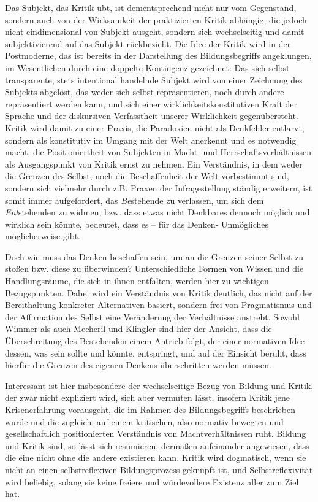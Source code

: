 Das Subjekt, das Kritik übt, ist dementsprechend nicht nur vom Gegenstand,
sondern auch von der Wirksamkeit der praktizierten Kritik abhängig, die jedoch
nicht eindimensional von Subjekt ausgeht, sondern sich wechselseitig und damit
subjektivierend auf das Subjekt rückbezieht. Die Idee der Kritik wird in der
Postmoderne, das ist bereits in der Darstellung des Bildungsbegriffs
angeklungen, im Wesentlichen durch eine doppelte Kontingenz gezeichnet: Das
sich selbst transparente, stets intentional handelnde Subjekt wird von einer
Zeichnung des Subjekts abgelöst, das weder sich selbst repräsentieren, noch
durch andere repräsentiert werden kann, und sich einer
\glqq wirklichkeitskonstitutiven Kraft der Sprache und der diskursiven Verfasstheit
unserer Wirklichkeit \grqq\footnotemark {} gegenübersteht. Kritik wird damit zu einer Praxis, die
Paradoxien nicht als Denkfehler entlarvt, sondern als konstitutiv im Umgang mit
der Welt  anerkennt und es notwendig macht, die Positioniertheit von Subjekten
in Macht- und Herrschaftsverhältnissen als Ausgangspunkt von Kritik ernst zu
nehmen.  Ein Verständnis, in dem weder die Grenzen des Selbst, noch die
Beschaffenheit der Welt vorbestimmt sind, sondern sich vielmehr durch z.B.
Praxen der Infragestellung ständig erweitern, ist somit immer aufgefordert, das
\textit{Be}stehende zu verlassen, um sich dem \textit{Ent}stehenden zu widmen, bzw. \glqq dass etwas
nicht Denkbares dennoch möglich und wirklich sein könnte, bedeutet, dass es –
für das Denken- Unmögliches möglicherweise gibt.\grqq\footnotemark
{}

Doch wie muss das Denken beschaffen sein, um an die Grenzen seiner Selbst zu
stoßen bzw. diese zu überwinden? Unterschiedliche Formen von Wissen und die
Handlungsräume, die sich in ihnen entfalten, werden hier zu wichtigen
Bezugspunkten.  Dabei wird ein Verständnis von Kritik deutlich, das nicht auf
der Bereithaltung konkreter Alternativen basiert, sondern frei von Pragmatismus
und der Affirmation des Selbst eine Veränderung der Verhältnisse anstrebt.
Sowohl Wimmer als auch Mecheril und Klingler sind hier der Ansicht, dass die
Überschreitung des Bestehenden einem Antrieb folgt, der einer normativen Idee
dessen, was sein sollte und könnte, entspringt, und auf der Einsicht beruht,
dass hierfür die Grenzen des eigenen Denkens überschritten werden müssen.

Interessant ist hier insbesondere der wechselseitige Bezug von Bildung und
Kritik, der zwar nicht expliziert wird, sich aber vermuten lässt, insofern
Kritik jene Krisenerfahrung vorausgeht, die im Rahmen des Bildungsbegriffs
beschrieben wurde und die zugleich, auf einem kritischen, also normativ
bewegten und gesellschaftlich positionierten Verständnis von Machtverhältnissen
ruht. Bildung und Kritik sind, so lässt sich resümieren, dermaßen aufeinander
angewiesen, dass die  eine nicht ohne die andere existieren kann. Kritik wird
dogmatisch, wenn sie nicht an einen selbstreflexiven Bildungsprozess geknüpft
ist, und Selbstreflexivität wird beliebig, solang sie keine freiere und
würdevollere Existenz aller zum Ziel hat. 

